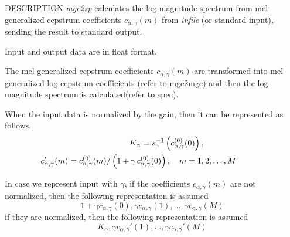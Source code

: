 \begin{qsection}{DESCRIPTION}
{\em mgc2sp} calculates the log magnitude spectrum 
from mel-generalized cepstrum coefficients $c_{\alpha, \gamma}(m)$
from {\em infile} (or standard input),
sending the result to standard output.

Input and output data are in float format.

The mel-generalized cepstrum coefficients $c_{\alpha, \gamma}(m)$
are transformed into mel-generalized log cepstrum coefficients
(refer to mgc2mgc)
and then the log magnitude spectrum is calculated(refer to spec).

When the input data is normalized by the gain,
then it can be represented as follows.
\begin{eqnarray*}
\hspace{-15mm}&&K_{\alpha} = 
	s_{\gamma}^{-1}\left(c_{\alpha,\gamma}^{(0)}(0)\right), 
	  \qquad\qquad \\ 
\hspace{-15mm}&&c_{\alpha,\gamma}'(m) =
          c_{\alpha,\gamma}^{(0)}(m)/\left(1+\gamma\,
	  c_{\alpha,\gamma}^{(0)}(0)\right), \quad m = 1,2,\ldots, M 
\end{eqnarray*}

In case we represent input with $\gamma$,
if the coefficients $c_{\alpha,\gamma}(m)$ are not normalized, then
the following representation is assumed
\begin{displaymath}
1+\gamma c_{\alpha,\gamma}(0), \gamma c_{\alpha,\gamma}(1), \ldots, \gamma c_{\alpha,\gamma}(M)
\end{displaymath}
if they are normalized, then
the following representation is assumed
\begin{displaymath}
K_\alpha,\gamma c_{\alpha,\gamma}'(1),\ldots, \gamma c_{\alpha,\gamma}'(M)
\end{displaymath}

\end{qsection}

